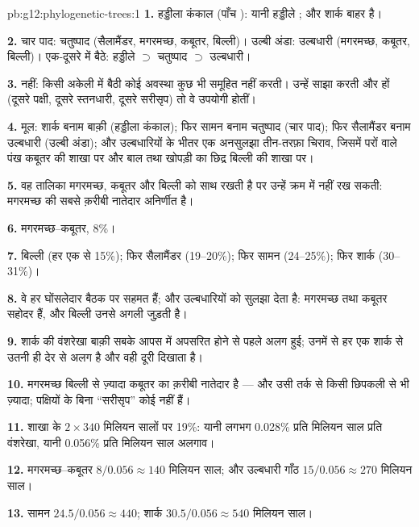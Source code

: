 \begin{solution}{pb:g12:phylogenetic-trees:1}
\textbf{1.} हड्डीला कंकाल (पाँच ): यानी हड्डीले ; और शार्क
बाहर है।

\textbf{2.} चार पाद: चतुष्पाद (सैलामैंडर, मगरमच्छ, कबूतर, बिल्ली)। उल्बी
अंडा: उल्बधारी (मगरमच्छ, कबूतर, बिल्ली)। एक-दूसरे में बैठे:
हड्डीले  $\supset$ चतुष्पाद $\supset$ उल्बधारी।

\textbf{3.} नहीं: किसी अकेली  में बैठी कोई अवस्था कुछ भी समूहित नहीं
करती। उन्हें साझा करती और  हों (दूसरे पक्षी, दूसरे स्तनधारी, दूसरे
सरीसृप) तो वे उपयोगी होतीं।

\textbf{4.} मूल: शार्क बनाम बाक़ी (हड्डीला कंकाल); फिर सामन बनाम चतुष्पाद
(चार पाद); फिर सैलामैंडर बनाम उल्बधारी (उल्बी अंडा); और उल्बधारियों के भीतर
एक अनसुलझा तीन-तरफ़ा चिराव, जिसमें परों वाले पंख कबूतर की शाखा पर और बाल
तथा खोपड़ी का छिद्र बिल्ली की शाखा पर।

\textbf{5.} वह तालिका मगरमच्छ, कबूतर और बिल्ली को साथ रखती है पर उन्हें
क्रम में नहीं रख सकती: मगरमच्छ की सबसे क़रीबी नातेदार अनिर्णीत है।

\textbf{6.} मगरमच्छ--कबूतर, 8\%।

\textbf{7.} बिल्ली (हर एक से 15\%); फिर सैलामैंडर (19--20\%); फिर सामन
(24--25\%); फिर शार्क (30--31\%)।

\textbf{8.} वे हर घोंसलेदार बैठक पर सहमत हैं; और  उल्बधारियों को सुलझा
देता है: मगरमच्छ तथा कबूतर सहोदर हैं, और बिल्ली उनसे अगली जुड़ती है।

\textbf{9.} शार्क की वंशरेखा बाक़ी सबके आपस में अपसरित होने से पहले अलग हुई;
उनमें से हर एक शार्क से उतनी ही देर से अलग है और वही दूरी दिखाता है।

\textbf{10.} मगरमच्छ बिल्ली से ज़्यादा कबूतर का क़रीबी नातेदार है --- और
उसी तर्क से किसी छिपकली से भी ज़्यादा; पक्षियों के बिना ``सरीसृप'' कोई
 नहीं हैं।

\textbf{11.} शाखा के $2 \times 340$ मिलियन सालों पर 19\%: यानी लगभग
0.028\% प्रति मिलियन साल प्रति वंशरेखा, यानी 0.056\% प्रति मिलियन साल
अलगाव।

\textbf{12.} मगरमच्छ--कबूतर $8/0.056 \approx 140$ मिलियन साल; और उल्बधारी
गाँठ $15/0.056 \approx 270$ मिलियन साल।

\textbf{13.} सामन $24.5/0.056 \approx 440$; शार्क $30.5/0.056
\approx 540$ मिलियन साल।


\end{solution}
